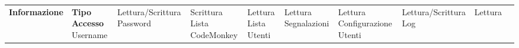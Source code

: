 \phantom{M}%


\begin{tabularx}
    {\textwidth} {|X|X|}
    \hline  {}
    \n      {}
    \large \textbf{Informazione}  & \centering\large\textbf{Tipo Accesso}
    \n      Username              & Lettura/Scrittura
    \n      Password              & Scrittura
    \n      Lista CodeMonkey      & Lettura
    \n      Lista Utenti          & Lettura
    \n      Segnalazioni          & Lettura
    \n      Configurazione Utenti & Lettura/Scrittura
    \n      Log                   & Lettura
    \n
\end{tabularx}\label{tab:monkeytable:problema:tabellaRuoloInformazioni:Amministratore}